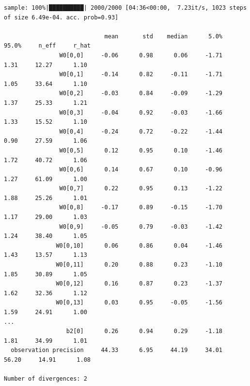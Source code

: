 \documentclass{article}
\begin{document}
\begin{lstlisting}[caption= {Results of Inference with HMC},captionpos=t]
sample: 100%|██████████| 2000/2000 [04:36<00:00,  7.23it/s, 1023 steps of size 6.49e-04. acc. prob=0.93]

                             mean       std    median      5.0%     95.0%     n_eff     r_hat
                W0[0,0]     -0.06      0.98      0.06     -1.71      1.31     12.27      1.10
                W0[0,1]     -0.14      0.82     -0.11     -1.71      1.05     33.64      1.10
                W0[0,2]     -0.03      0.84     -0.09     -1.29      1.37     25.33      1.21
                W0[0,3]     -0.04      0.92     -0.03     -1.66      1.33     15.52      1.10
                W0[0,4]     -0.24      0.72     -0.22     -1.44      0.90     27.59      1.06
                W0[0,5]      0.12      0.95      0.10     -1.46      1.72     40.72      1.06
                W0[0,6]      0.14      0.67      0.10     -0.96      1.27     61.09      1.00
                W0[0,7]      0.22      0.95      0.13     -1.22      1.88     25.26      1.01
                W0[0,8]     -0.17      0.89     -0.15     -1.70      1.17     29.00      1.03
                W0[0,9]     -0.05      0.79     -0.03     -1.42      1.24     38.40      1.05
               W0[0,10]      0.06      0.86      0.04     -1.46      1.43     13.57      1.13
               W0[0,11]      0.20      0.88      0.23     -1.10      1.85     30.89      1.05
               W0[0,12]      0.16      0.87      0.23     -1.37      1.62     32.36      1.12
               W0[0,13]      0.03      0.95     -0.05     -1.56      1.59     24.91      1.00
...
                  b2[0]      0.26      0.94      0.29     -1.18      1.81     34.99      1.01
  observation precision     44.33      6.95     44.19     34.01     56.20     14.91      1.08

Number of divergences: 2
\end{lstlisting}
\end{document}
